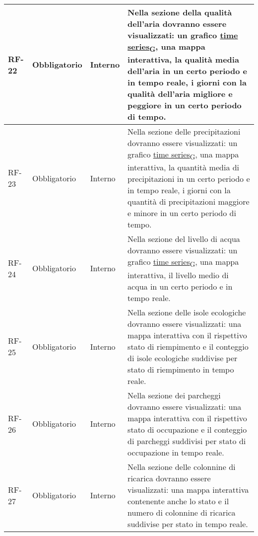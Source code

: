 \begin{longtable}{|>{\centering\arraybackslash}m{}|>{\centering\arraybackslash}m{}|>{\centering\arraybackslash}m{}|>{\centering\arraybackslash}m{}|}
	\\\hline
	RF-22           & Obbligatorio        & Interno                                                                                                           & Nella sezione della qualità dell'aria dovranno essere visualizzati: un grafico \href{https://7last.github.io/docs/pb/documentazione-interna/glossario\#time-series}{time series\textsubscript{G}}, una mappa interattiva, la qualità media dell'aria in un certo periodo e in tempo reale, i giorni con la qualità dell'aria migliore e peggiore in un certo periodo di tempo.
	\\\hline
	RF-23           & Obbligatorio        & Interno                                                                                                           & Nella sezione delle precipitazioni dovranno essere visualizzati: un grafico \href{https://7last.github.io/docs/pb/documentazione-interna/glossario\#time-series}{time series\textsubscript{G}}, una mappa interattiva, la quantità media di precipitazioni in un certo periodo e in tempo reale, i giorni con la quantità di precipitazioni maggiore e minore in un certo periodo di tempo.
	\\\hline
	RF-24           & Obbligatorio        & Interno                                                                                                           & Nella sezione del livello di acqua dovranno essere visualizzati: un grafico \href{https://7last.github.io/docs/pb/documentazione-interna/glossario\#time-series}{time series\textsubscript{G}}, una mappa interattiva, il livello medio di acqua in un certo periodo e in tempo reale.
	\\\hline
	RF-25           & Obbligatorio        & Interno                                                                                                           & Nella sezione delle isole ecologiche dovranno essere visualizzati: una mappa interattiva con il rispettivo stato di riempimento e il conteggio di isole ecologiche suddivise per stato di riempimento in tempo reale.
	\\\hline
	RF-26           & Obbligatorio        & Interno                                                                                                           & Nella sezione dei parcheggi dovranno essere visualizzati: una mappa interattiva con il rispettivo stato di occupazione e il conteggio di parcheggi suddivisi per stato di occupazione in tempo reale.
	\\\hline
	RF-27           & Obbligatorio        & Interno                                                                                                           & Nella sezione delle colonnine di ricarica dovranno essere visualizzati: una mappa interattiva contenente anche lo stato e il numero di colonnine di ricarica suddivise per stato in tempo reale.

\end{longtable}
